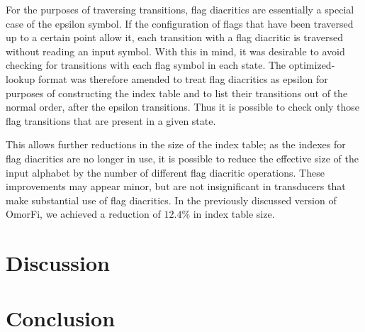\documentclass{llncs}
\begin{document}
For the purposes of traversing transitions, flag diacritics are essentially
a special case of the epsilon symbol. If the configuration of flags
that have been traversed up to a certain point allow it, each transition
with a flag diacritic is traversed without reading an input symbol. With
this in mind, it was desirable to avoid checking for transitions with each
flag symbol in each state. The optimized-lookup format was therefore amended
to treat flag diacritics as epsilon for purposes of constructing the index
table and to list their transitions out of the normal order, after the epsilon
transitions. Thus it is possible to check only those flag transitions that
are present in a given state.

This allows further reductions in the size of the index table; as
the indexes for flag diacritics are no longer in use, it is possible to reduce
the effective size of the input alphabet by the number of different flag
diacritic operations. These improvements may appear minor, but are not
insignificant in transducers that make substantial use of flag diacritics. In
the previously discussed version of OmorFi, we achieved a reduction of $12.4\%$
in index table size.

\section{Discussion}

\section{Conclusion}

%
%
%



\end{document}
